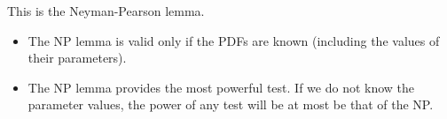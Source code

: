 This is the Neyman-Pearson lemma. 

\begin{itemize}[$\to$]
  \item The NP lemma is valid only if the PDFs are known (including the values of their parameters).
  \item The NP lemma provides the most powerful test. If we do not know the parameter values, the power of any test will be at most be that of the NP.

\end{itemize}
